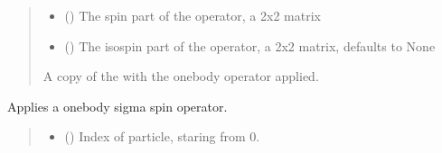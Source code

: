 \documentclass[letterpaper,10pt,english]{sphinxmanual}
\begin{document}
\begin{fulllineitems}
\begin{fulllineitems}
\begin{quote}
\begin{description}
\begin{itemize}
\item {} 
\sphinxAtStartPar
{} () \textendash{} The spin part of the operator, a 2x2 matrix

\item {} 
\sphinxAtStartPar
{} (\sphinxstyleliteralemphasis{\sphinxupquote{, }}) \textendash{} The isospin part of the operator, a 2x2 matrix, defaults to None

\end{itemize}

\sphinxAtStartPar
A copy of the  with the one\sphinxhyphen{}body operator applied.

\sphinxAtStartPar
{\hyperref[\detokenize{spinbox:spinbox.core.ProductOperator}]{}}

\end{description}\end{quote}

\end{fulllineitems}


\begin{fulllineitems}
\label{\detokenize{spinbox:spinbox.core.ProductOperator.apply_sigma}}
\pysigstartsignatures
{}
\pysigstopsignatures
\sphinxAtStartPar
Applies a one\sphinxhyphen{}body sigma spin operator.
\begin{quote}\begin{description}
\begin{itemize}
\item {} 
\sphinxAtStartPar
{} () \textendash{} Index of particle, staring from 0.


\end{itemize}
\end{description}
\end{quote}
\end{fulllineitems}
\end{fulllineitems}
\end{document}
